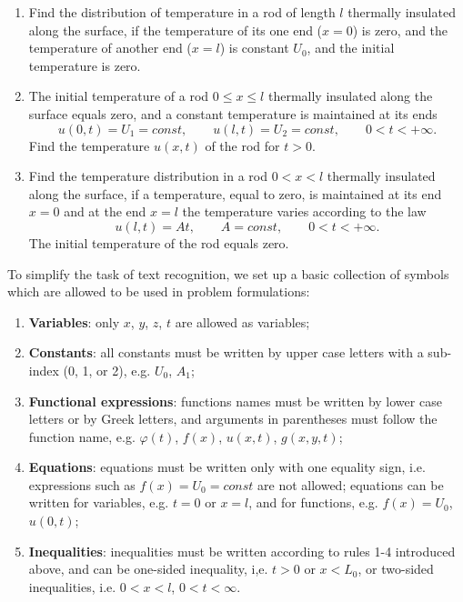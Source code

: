 \begin{enumerate}
\item Find the distribution of temperature in a rod of length $l$ thermally insulated along the surface, if the temperature of its one end ($x=0$) is zero, and the temperature of another end ($x=l$) is constant $U_{0}$, and the initial temperature is zero.
\item The initial temperature of a rod $0\leq x\leq l$ thermally insulated along the surface equals zero, and a constant temperature is maintained at its ends 
\begin{equation*}
u(0,t)=U_{1}=const, \qquad u(l,t)=U_{2}=const, \qquad 0<t<+\infty.
\end{equation*}
Find the temperature $u(x,t)$ of the rod for $t>0$.
\item Find the temperature distribution in a rod $0<x<l$ thermally insulated along the surface, if a temperature, equal to zero, is maintained at its end $x=0$ and at the end $x=l$ the temperature varies according to the law
\begin{equation*}
u(l,t)=At, \qquad A=const, \qquad 0<t<+\infty.
\end{equation*}
The initial temperature of the rod equals zero.
\end{enumerate}
To simplify the task of text recognition, we set up a basic collection of symbols which are allowed to be used in problem formulations:
\begin{enumerate}
\item {\bfseries Variables}: only $x$, $y$, $z$, $t$ are allowed as variables;
\item {\bfseries Constants}: all constants must be written by upper case letters with a sub-index (0, 1, or 2), e.g. $U_{0}$, $A_{1}$;
\item {\bfseries Functional expressions}: functions names must be written by lower case letters or by Greek letters, and arguments in parentheses must follow the function name, e.g. $\varphi(t)$, $f(x)$, $u(x,t)$, $g(x,y,t)$;
\item {\bfseries Equations}: equations must be written only with one equality sign, i.e. expressions such as $f(x)=U_{0}=const$ are not allowed; equations can be written for variables, e.g. $t=0$ or $x=l$, and for functions, e.g. $f(x)=U_{0}$, $u(0,t)$;
\item {\bfseries Inequalities}: inequalities must be written according to rules 1-4 introduced above, and can be one-sided inequality, i,e. $t>0$ or $x<L_{0}$, or two-sided inequalities, i.e. $0<x<l$, $0<t<\infty$.
\end{enumerate}\par
